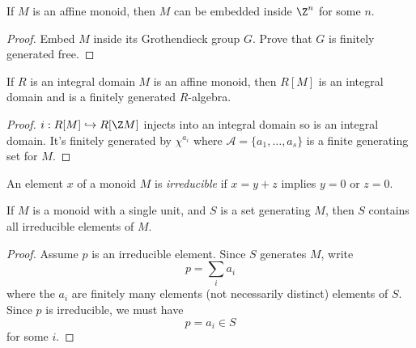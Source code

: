 \begin{proposition}
  \label{0-embed-aff-mon}
  \leanok

  If $M$ is an affine monoid, then $M$ can be embedded inside $\Z^n$ for some $n$.
\end{proposition}
\begin{proof}
  \leanok

  Embed $M$ inside its Grothendieck group $G$. Prove that $G$ is finitely generated free.
\end{proof}


\begin{proposition}
  \label{0-aff-mon-alg-domain}
  \leanok

  If $R$ is an integral domain $M$ is an affine monoid, then $R[M]$ is an integral domain and is a finitely generated $R$-algebra.
\end{proposition}
\begin{proof}
  \leanok

  $i : R[M] \hookrightarrow R[\Z M]$ injects into an integral domain so is an integral domain. It's finitely generated by $\chi^{a_i}$ where $\mathcal A = \{a_1, \dotsc, a_s\}$ is a finite generating set for $M$.
\end{proof}


\begin{definition}
  \label{0-irred}
  \leanok

  An element $x$ of a monoid $M$ is \emph{irreducible} if $x = y + z$ implies $y = 0$ or $z = 0$.
\end{definition}


\begin{proposition}
  \label{0-irred-subset-gen}
  \leanok

  If $M$ is a monoid with a single unit, and $S$ is a set generating $M$, then $S$ contains all irreducible elements of $M$.
\end{proposition}
\begin{proof}
  \leanok

  Assume $p$ is an irreducible element. Since $S$ generates $M$, write
  \[
    p = \sum_i a_i
  \]
  where the $a_i$ are finitely many elements (not necessarily distinct) elements of $S$. Since $p$ is irreducible, we must have
  \[
    p = a_i \in S
  \]
  for some $i$.
\end{proof}


